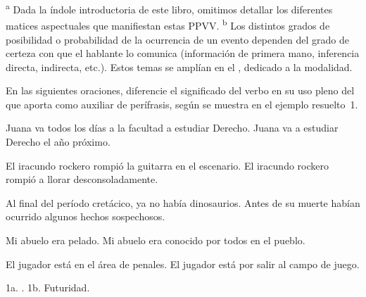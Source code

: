 {\scriptsize\noindent\textsuperscript{a} Dada la índole introductoria de este
libro, omitimos detallar los diferentes matices aspectuales que manifiestan
estas PPVV. \textsuperscript{b} Los distintos grados de posibilidad o
probabilidad de la ocurrencia de un evento dependen del grado de certeza con que
el hablante lo comunica (información de primera mano, inferencia directa,
indirecta, etc.). Estos temas se amplían en el , dedicado a la
modalidad.\par}

\begin{ejercicio}\label{ej:11-pleno}
En las siguientes oraciones, diferencie el significado del verbo en su uso pleno
del que aporta como auxiliar de perífrasis, según se muestra en el ejemplo
resuelto~1.

\begin{exe}
  \ex
    \begin{xlist}
      \ex Juana va todos los días a la facultad a estudiar Derecho.
      \ex Juana va a estudiar Derecho el año próximo.
    \end{xlist}
  \ex
    \begin{xlist}
      \ex El iracundo rockero rompió la guitarra en el escenario.
      \ex El iracundo rockero rompió a llorar desconsoladamente.
    \end{xlist}
  \ex
    \begin{xlist}
      \ex Al final del período cretácico, ya no había dinosaurios.
      \ex Antes de su muerte habían ocurrido algunos hechos sospechosos.
    \end{xlist}
  \ex
    \begin{xlist}
      \ex Mi abuelo era pelado.
      \ex Mi abuelo era conocido por todos en el pueblo.
    \end{xlist}
  \ex
    \begin{xlist}
      \ex El jugador está en el área de penales.
      \ex El jugador está por salir al campo de juego.
    \end{xlist}
\end{exe}

\begin{resuelto}
1a. . 1b. Futuridad.
\end{resuelto}
\end{ejercicio}

